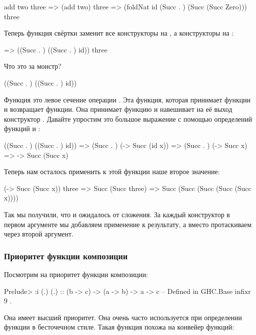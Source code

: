 \begin{code}
    add two three 
=>  (add two) three
=>  (foldNat id (Succ . ) (Succ (Succ Zero))) three
\end{code}

Теперь функция свёртки заменит все конструкторы  
на , а конструкторы  на :

\begin{code}
=>  ((Succ . ) ((Succ . ) id)) three
\end{code}

Что это за монстр?

\begin{code}
((Succ . ) ((Succ . ) id))
\end{code}

Функция  это левое сечение операции . 
Эта функция, которая принимает функции и возвращает функции.
Она принимает функцию и навешивает на её выход конструктор .
Давайте упростим это большое выражение с помощью определений функций
 и :


\begin{code}
    ((Succ . ) ((Succ . ) id))
=>   (Succ . ) (\x -> Succ (id x))
=>   (Succ . ) (\x -> Succ x)
=>   \x -> Succ (Succ x)
\end{code}

Теперь нам осталось применить к этой функции наше второе
значение:

\begin{code}
    (\x -> Succ (Succ x)) three
=>  Succ (Succ three)
=>  Succ (Succ (Succ (Succ (Succ x))))
\end{code}

Так мы получили, что и ожидалось от сложения. За каждый
конструктор  в первом аргументе мы добавляем 
применение  к результату, а вместо 
протаскиваем через  второй аргумент. 

\subsubsection{Приоритет функции композиции}

Посмотрим на приоритет функции композиции:

\begin{code}
Prelude> :i (.)
(.) :: (b -> c) -> (a -> b) -> a -> c 	-- Defined in GHC.Base
infixr 9 .
\end{code}

Она имеет высший приоритет. Она очень часто используется
при определении функции в бесточечном стиле. Такая функция 
похожа на конвейер функций:

